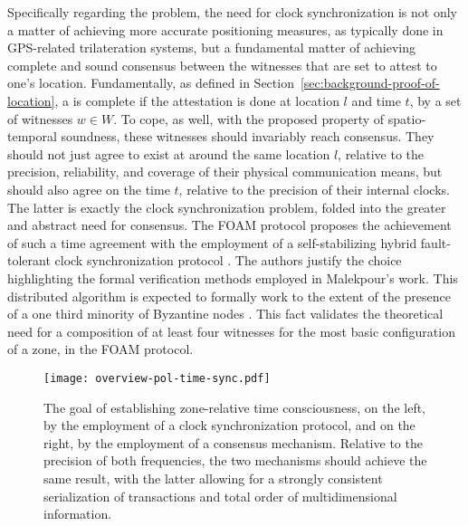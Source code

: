 Specifically regarding the \pol{} problem, the need for clock synchronization is not only a matter of achieving more accurate positioning measures, as typically done in GPS-related trilateration systems, but a fundamental matter of achieving complete and sound consensus between the witnesses that are set to attest to one's location. Fundamentally, as defined in Section~\ref{sec:background-proof-of-location}, a \pol{} is complete if the attestation is done at location $l$ and time $t$, by a set of witnesses $w \in W$. To cope, as well, with the proposed property of spatio-temporal soundness, these witnesses should invariably reach consensus. They should not just agree to exist at around the same location $l$, relative to the precision, reliability, and coverage of their physical communication means, but should also agree on the time $t$, relative to the precision of their internal clocks. The latter is exactly the clock synchronization problem, folded into the greater and abstract need for consensus. The FOAM protocol proposes the achievement of such a time agreement with the employment of a self-stabilizing hybrid fault-tolerant clock synchronization protocol \cite{foam-white-paper, malekpour2015self}. The authors justify the choice highlighting the formal verification methods employed in Malekpour's work. This distributed algorithm is expected to formally work to the extent of the presence of a one third minority of Byzantine nodes \cite{lamport2019byzantine}. This fact validates the theoretical need for a composition of at least four witnesses for the most basic configuration of a zone, in the FOAM protocol. 

\begin{figure}[ht]
    \begin{center}
    \texttt{[image: overview-pol-time-sync.pdf]}
    \caption{The goal of establishing zone-relative time consciousness, on the left, by the employment of a clock synchronization protocol, and on the right, by the employment of a consensus mechanism. Relative to the precision of both frequencies, the two mechanisms should achieve the same result, with the latter allowing for a strongly consistent serialization of transactions and total order of multidimensional information.}
    \label{fig:proof-of-location-overview-time-sync}
    \end{center}
\end{figure}

